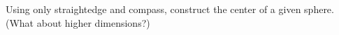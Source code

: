 Using only straightedge and compass,
construct the center of a given sphere.
\newline (What about higher dimensions?)
